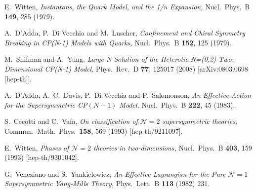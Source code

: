 \documentclass[epsfig,12pt]{article}
\begin{document}
\small
\begin{thebibliography}{99}

E.~Witten,
 {\em Instantons, the Quark Model, and the 1/n Expansion,}
  Nucl.\ Phys.\ B {\bf 149}, 285 (1979).
  
   A.~D'Adda, P.~Di Vecchia and M.~Luscher,
{\em Confinement and Chiral Symmetry Breaking in CP(N-1) Models with Quarks,}
  Nucl.\ Phys.\ B {\bf 152}, 125 (1979).
  
    M.~Shifman and A.~Yung,
{\em Large-N Solution of the Heterotic N=(0,2) Two-Dimensional CP(N-1) Model,}
  Phys.\ Rev.\  D {\bf 77}, 125017 (2008)
  [arXiv:0803.0698 [hep-th]].

  A.~D'Adda, A.~C.~Davis, P.~Di Vecchia and P.~Salomonson,
 {\em An Effective Action for the Supersymmetric {CP}${(N-1)}$ Model,}
  Nucl.\ Phys.\ B {\bf 222}, 45 (1983).
  
    S.~Cecotti and C.~Vafa,
  {\em On classification of ${\mathcal N}=2$ supersymmetric theories,}
  Commun.\ Math.\ Phys.\  {\bf 158}, 569 (1993)
  [hep-th/9211097].
  
      E.~Witten,
{\em Phases of ${\mathcal N}=2$ theories in two-dimensions,}
  Nucl.\ Phys.\ B {\bf 403}, 159 (1993)
  [hep-th/9301042].
  
  
  G.~Veneziano and S.~Yankielowicz,
  {\em An Effective Lagrangian for the Pure ${\mathcal N}=1$ Supersymmetric Yang-Mills Theory,}
  Phys.\ Lett.\ B {\bf 113} (1982) 231.
  

\end{thebibliography}
\end{document}

